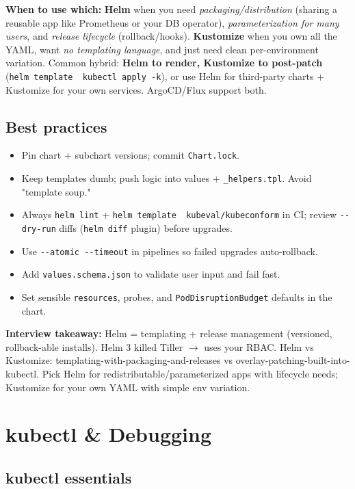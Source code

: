 \documentclass[11pt]{article}
\providecommand{\tightlist}{\setlength{\itemsep}{1pt}\setlength{\parskip}{0pt}}
\begin{document}
\textbf{When to use which:} \textbf{Helm} when you need \emph{packaging/distribution} (sharing a reusable app like Prometheus or your DB operator), \emph{parameterization for many users}, and \emph{release lifecycle} (rollback/hooks). \textbf{Kustomize} when you own all the YAML, want \emph{no templating language}, and just need clean per-environment variation. Common hybrid: \textbf{Helm to render, Kustomize to post-patch} (\texttt{helm\ template\ \textbar{}\ kubectl\ apply\ -k}), or use Helm for third-party charts + Kustomize for your own services. ArgoCD/Flux support both.

\subsection{Best practices}\label{best-practices}

\begin{itemize}
\tightlist
\item
  Pin chart + subchart versions; commit \texttt{Chart.lock}.
\item
  Keep templates dumb; push logic into values + \texttt{\_helpers.tpl}. Avoid "template soup."
\item
  Always \texttt{helm\ lint} + \texttt{helm\ template\ \textbar{}\ kubeval/kubeconform} in CI; review \texttt{-\/-dry-run} diffs (\texttt{helm\ diff} plugin) before upgrades.
\item
  Use \texttt{-\/-atomic\ -\/-timeout} in pipelines so failed upgrades auto-rollback.
\item
  Add \texttt{values.schema.json} to validate user input and fail fast.
\item
  Set sensible \texttt{resources}, probes, and \texttt{PodDisruptionBudget} defaults in the chart.
\end{itemize}

\textbf{Interview takeaway:} Helm = templating + release management (versioned, rollback-able installs). Helm 3 killed Tiller \(\rightarrow\) uses your RBAC. Helm vs Kustomize: templating-with-packaging-and-releases vs overlay-patching-built-into-kubectl. Pick Helm for redistributable/parameterized apps with lifecycle needs; Kustomize for your own YAML with simple env variation.

\section{kubectl \& Debugging}\label{kubectl--debugging}

\subsection{kubectl essentials}\label{kubectl-essentials}
\end{document}
